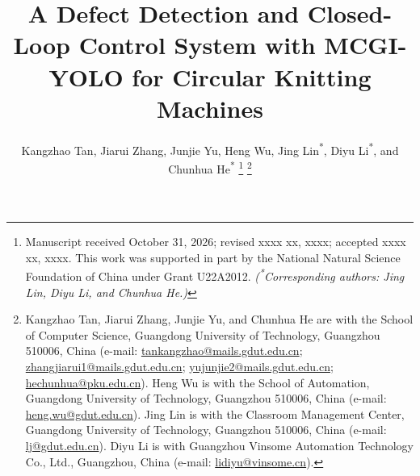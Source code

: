 \documentclass[journal]{IEEEtranTIE}
\begin{document}
\raggedbottom

\title{A Defect Detection and Closed-Loop Control System with MCGI-YOLO for Circular Knitting Machines}

\author{Kangzhao Tan, Jiarui Zhang, Junjie Yu, Heng Wu, Jing Lin\textsuperscript{*}, Diyu Li\textsuperscript{*}, and Chunhua He\textsuperscript{*}%
\thanks{Manuscript received October 31, 2026; revised xxxx xx, xxxx; accepted xxxx xx, xxxx. This work was supported in part by the National Natural Science Foundation of China under Grant U22A2012. \textit{(\textsuperscript{*}Corresponding authors: Jing Lin, Diyu Li, and Chunhua He.)}}%
\thanks{\begingroup{}Kangzhao Tan, Jiarui Zhang, Junjie Yu, and Chunhua He are with the School of Computer Science, Guangdong University of Technology, Guangzhou 510006, China (e-mail: \protect\url{tankangzhao@mails.gdut.edu.cn}; \protect\url{zhangjiarui1@mails.gdut.edu.cn}; \protect\url{yujunjie2@mails.gdut.edu.cn}; \protect\url{hechunhua@pku.edu.cn}). Heng Wu is with the School of Automation, Guangdong University of Technology, Guangzhou 510006, China (e-mail: \protect\url{heng.wu@gdut.edu.cn}). Jing Lin is with the Classroom Management Center, Guangdong University of Technology, Guangzhou 510006, China (e-mail: \protect\url{lj@gdut.edu.cn}). Diyu Li is with Guangzhou Vinsome Automation Technology Co., Ltd., Guangzhou, China (e-mail: \protect\url{lidiyu@vinsome.cn}).\endgroup}%
}

\maketitle
\end{document}
